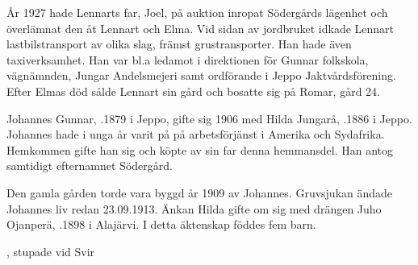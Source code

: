 År 1927 hade Lennarts far, Joel, på auktion inropat Södergårds lägenhet och överlämnat den åt Lennart och Elma. Vid sidan av jordbruket idkade Lennart lastbilstransport av olika slag, främst grustransporter. Han hade även taxiverksamhet. Han var bl.a ledamot i direktionen för Gunnar folkskola, vägnämnden, Jungar Andelsmejeri samt ordförande i Jeppo Jaktvårdsförening. Efter Elmas död sålde Lennart sin gård och bosatte sig på Romar, gård 24.


%
Johannes Gunnar, .1879 i Jeppo, gifte sig 1906 med Hilda Jungarå, .1886 i Jeppo. Johannes hade i unga år varit på på arbetsförjänst i Amerika och Sydafrika. Hemkommen gifte han sig och köpte av sin far denna hemmansdel. Han antog samtidigt efternamnet Södergård.
\begin{jhchildren}
  \item {}
  \item {}
  \item {}
  \item {}
\end{jhchildren}

Den gamla gården torde vara byggd år 1909 av Johannes. Gruvsjukan ändade Johannes liv redan 23.09.1913. Änkan Hilda gifte om sig med drängen Juho Ojanperä, .1898 i Alajärvi. I detta äktenskap föddes fem barn.
\begin{jhchildren}
  \item {}
  \item {}
  \item {}
  \item {}, stupade vid Svir
  \item {}
\end{jhchildren}

